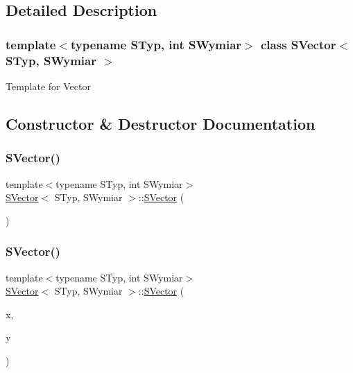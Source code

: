 \subsection{Detailed Description}
\subsubsection*{template$<$typename S\+Typ, int S\+Wymiar$>$\newline
class S\+Vector$<$ S\+Typ, S\+Wymiar $>$}

Template for Vector 

\subsection{Constructor \& Destructor Documentation}
\mbox{\label{classSVector_abfa8373f84e633e4e3e1809872a8407e}} 
\subsubsection{\texorpdfstring{S\+Vector()}{SVector()}\hspace{0.1cm}{\footnotesize\ttfamily [1/2]}}
{\footnotesize\ttfamily template$<$typename S\+Typ, int S\+Wymiar$>$ \\
\hyperlink{classSVector}{S\+Vector}$<$ S\+Typ, S\+Wymiar $>$\+::\hyperlink{classSVector}{S\+Vector} (\begin{DoxyParamCaption}{ }\end{DoxyParamCaption})\hspace{0.3cm}{\ttfamily [inline]}}

\mbox{\label{classSVector_a73f43519424798b4987b2c462798817e}} 
\subsubsection{\texorpdfstring{S\+Vector()}{SVector()}\hspace{0.1cm}{\footnotesize\ttfamily [2/2]}}
{\footnotesize\ttfamily template$<$typename S\+Typ, int S\+Wymiar$>$ \\
\hyperlink{classSVector}{S\+Vector}$<$ S\+Typ, S\+Wymiar $>$\+::\hyperlink{classSVector}{S\+Vector} (\begin{DoxyParamCaption}\item[{S\+Typ}]{x,  }\item[{S\+Typ}]{y }\end{DoxyParamCaption})\hspace{0.3cm}{\ttfamily [inline]}}



